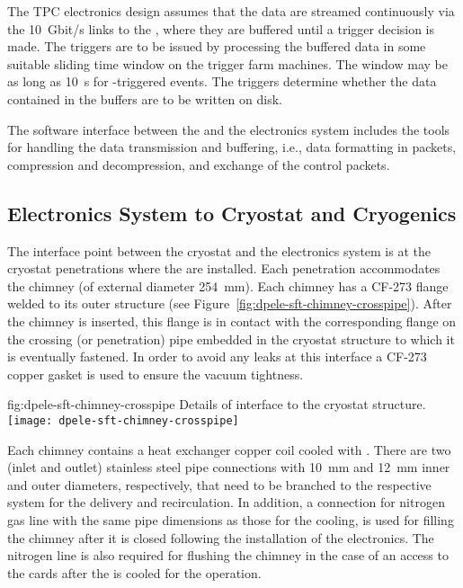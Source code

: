 The TPC electronics design assumes that the data are streamed continuously via the \SI{10}{Gbit/s} links to the , where they are buffered until a trigger decision %
is made. The triggers are to be issued by processing the buffered data in some suitable sliding time window on the trigger farm machines. 
The window may be as long as \SI{10}{s} for -triggered events.
The triggers determine whether the data contained in the buffers are to be written on disk. 

The software interface between the  and the electronics system
includes the tools for handling the data transmission and buffering, i.e.,  data formatting in  packets, compression and decompression, and exchange of the control packets.

\subsection{Electronics System to Cryostat and Cryogenics}
\label{sec:fddp-tpc-elec-intfc-cryo}

The interface point between the cryostat and the \dual electronics system is at the cryostat penetrations where the  are %
installed. Each penetration %
accommodates the chimney (of external diameter \SI{254}{\mm}). Each chimney has a CF-273 flange welded to its outer structure (see Figure~\ref{fig:dpele-sft-chimney-crosspipe}). After the chimney is inserted, this flange is in contact with the corresponding flange on the crossing (or penetration) pipe embedded in the cryostat structure to which it is eventually fastened. In order to avoid any leaks at this interface a CF-273 copper gasket is used to ensure the vacuum tightness.  

\begin{dunefigure}{fig:dpele-sft-chimney-crosspipe}
{Details of  interface to the cryostat structure.}
\texttt{[image: dpele-sft-chimney-crosspipe]}
\end{dunefigure}

Each chimney contains a heat exchanger copper coil cooled with \lar. There are two (inlet and outlet) stainless steel pipe connections with \SI{10}{\mm} and \SI{12}{\mm} inner and outer diameters, respectively, that need to be branched to the respective system for the \lar delivery and recirculation. In addition, %
a connection for nitrogen gas line with the same pipe dimensions as those for the \lar cooling, %
is used for filling the chimney after it is closed following the installation of the  electronics. The nitrogen line is also required for flushing the chimney in the case of an access to the  cards after the  is cooled for the operation. 

